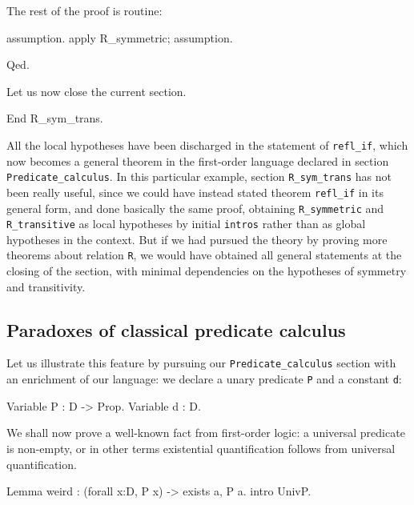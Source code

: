 \documentclass[11pt,a4paper]{book}
\begin{document}
The rest of the proof is routine:
\begin{coq_example}
assumption.
apply R_symmetric; assumption.
\end{coq_example}
\begin{coq_example*}
Qed.
\end{coq_example*}

Let us now close the current section.
\begin{coq_example}
End R_sym_trans.
\end{coq_example}

All the local hypotheses have been
discharged in the statement of \verb:refl_if:, which now becomes a general
theorem in the first-order language declared in section
\verb:Predicate_calculus:. In this particular example, section
\verb:R_sym_trans: has not been really useful, since we could have
instead stated theorem \verb:refl_if: in its general form, and done
basically the same proof, obtaining \verb:R_symmetric: and
\verb:R_transitive: as local hypotheses by initial \verb:intros: rather
than as global hypotheses in the context. But if we had pursued the
theory by proving more theorems about relation \verb:R:,
we would have obtained all general statements at the closing of the section,
with minimal dependencies on the hypotheses of symmetry and transitivity.

\subsection{Paradoxes of classical predicate calculus}

Let us illustrate this feature by pursuing our \verb:Predicate_calculus:
section with an enrichment of our language: we declare a unary predicate
\verb:P: and a constant \verb:d::
\begin{coq_example}
Variable P :  D -> Prop.
Variable d : D.
\end{coq_example}

We shall now prove a well-known fact from first-order logic: a universal
predicate is non-empty, or in other terms existential quantification
follows from universal quantification.
\begin{coq_example}
Lemma weird : (forall x:D, P x) ->  exists a, P a.
 intro UnivP.
\end{coq_example}
\end{document}

